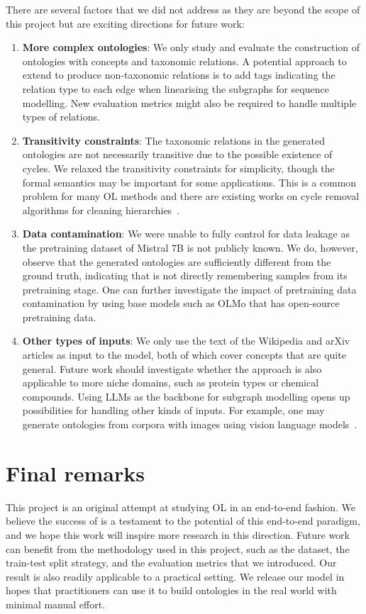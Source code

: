 There are several factors that we did not address as they are beyond the scope of this project but are exciting directions for future work:
\begin{enumerate}
    \item \textbf{More complex ontologies}: We only study and evaluate the construction of ontologies with concepts and taxonomic relations. A potential approach to extend \name to produce non-taxonomic relations is to add tags indicating the relation type to each edge when linearising the subgraphs for sequence modelling. New evaluation metrics might also be required to handle multiple types of relations.
    \item \textbf{Transitivity constraints}: The taxonomic relations in the generated ontologies are not necessarily transitive due to the possible existence of cycles. We relaxed the transitivity constraints for simplicity, though the formal semantics may be important for some applications. This is a common problem for many OL methods and there are existing works on cycle removal algorithms for cleaning hierarchies~\cite{sun2017breaking,zesch2007analysis}.
    \item \textbf{Data contamination}: We were unable to fully control for data leakage as the pretraining dataset of Mistral 7B is not publicly known. We do, however, observe that the generated ontologies are sufficiently different from the ground truth, indicating that \name is not directly remembering samples from its pretraining stage. One can further investigate the impact of pretraining data contamination by using base models such as OLMo \cite{OLMo} that has open-source pretraining data.
    \item \textbf{Other types of inputs}: We only use the text of the Wikipedia and arXiv articles as input to the model, both of which cover concepts that are quite general. Future work should investigate whether the approach is also applicable to more niche domains, such as protein types or chemical compounds. Using LLMs as the backbone for subgraph modelling opens up possibilities for handling other kinds of inputs. For example, one may generate ontologies from corpora with images using vision language models~\cite{donahue2015long}.
\end{enumerate}

\section{Final remarks}

This project is an original attempt at studying OL in an end-to-end fashion. We believe the success of \name is a testament to the potential of this end-to-end paradigm, and we hope this work will inspire more research in this direction. Future work can benefit from the methodology used in this project, such as the dataset, the train-test split strategy, and the evaluation metrics that we introduced. Our result is also readily applicable to a practical setting. We release our model \name in hopes that practitioners can use it to build ontologies in the real world with minimal manual effort.